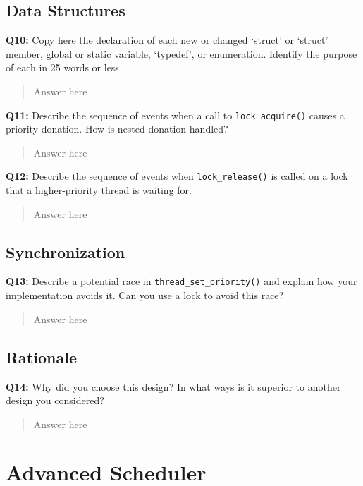 \documentclass[a4paper,11pt]{paper}
\begin{document}
\subsection{Data Structures}

\textbf{Q10:} Copy here the declaration of each new or changed `struct' or
`struct' member, global or static variable, `typedef', or enumeration.  Identify
the purpose of each in 25 words or less

\begin{quote}
  Answer here
\end{quote}

\textbf{Q11:} Describe the sequence of events when a call to
\texttt{lock\_acquire()} causes a priority donation.  How is nested donation
handled?

\begin{quote}
  Answer here
\end{quote}

\textbf{Q12:} Describe the sequence of events when \texttt{lock\_release()} is
called on a lock that a higher-priority thread is waiting for.

\begin{quote}
  Answer here
\end{quote}

\subsection{Synchronization}
 
\textbf{Q13:} Describe a potential race in \texttt{thread\_set\_priority()} and
explain how your implementation avoids it. Can you use a lock to avoid this
race?

\begin{quote}
  Answer here
\end{quote}

\subsection{Rationale}

\textbf{Q14:} Why did you choose this design?  In what ways is it superior to
another design you considered?

\begin{quote}
  Answer here
\end{quote}

\section{Advanced Scheduler}
\end{document}
